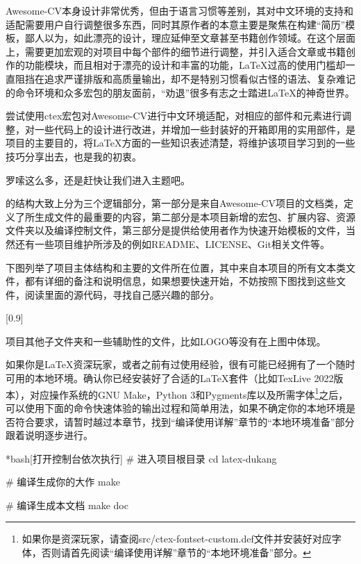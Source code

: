 Awesome-CV本身设计非常优秀，但由于语言习惯等差别，其对中文环境的支持和适配需要用户自行调整很多东西，同时其原作者的本意主要是聚焦在构建“简历”模板，鄙人以为，如此漂亮的设计，理应延伸至文章甚至书籍创作领域。在这个层面上，需要更加宏观的对项目中每个部件的细节进行调整，并引入适合文章或书籍创作的功能模块，而且相对于漂亮的设计和丰富的功能，{\LaTeX}过高的使用门槛却一直阻挡在追求严谨排版和高质量输出，却不是特别习惯看似古怪的语法、复杂难记的命令环境和众多宏包的朋友面前，“劝退”很多有志之士踏进{\LaTeX}的神奇世界。

尝试使用ctex宏包对Awesome-CV进行中文环境适配，对相应的部件和元素进行调整，对一些代码上的设计进行改进，并增加一些封装好的开箱即用的实用部件，是{\dk}项目的主要目的，将{\LaTeX}方面的一些知识表述清楚，将维护该项目学习到的一些技巧分享出去，也是我的初衷。

罗嗦这么多，还是赶快让我们进入主题吧。

{\dk}的结构大致上分为三个逻辑部分，第一部分是来自Awesome-CV项目的文档类，定义了所生成文件的最重要的内容，第二部分是本项目新增的宏包、扩展内容、资源文件夹以及编译控制文件，第三部分是提供给使用者作为快速开始模板的文件，当然还有一些项目维护所涉及的例如README、LICENSE、Git相关文件等。

下图列举了项目主体结构和主要的文件所在位置，其中来自本项目的所有文本类文件，都有详细的备注和说明信息，如果想要{\color{awesome}快速开始}，不妨按照下图找到这些文件，阅读里面的源代码，寻找自己感兴趣的部分。

[0.9]

\begin{dkcomment}
  项目其他子文件夹和一些辅助性的文件，比如LOGO等没有在上图中体现。
\end{dkcomment}


如果你是{\LaTeX}资深玩家，或者之前有过使用经验，很有可能已经拥有了一个随时可用的本地环境。确认你已经安装好了合适的{\LaTeX}套件（比如TexLive 2022版本），对应操作系统的GNU Make，Python 3和Pygments库以及所需字体\footnote{如果你是资深玩家，请查阅src/ctex-fontset-custom.def文件并安装好对应字体，否则请首先阅读“编译使用详解”章节的“本地环境准备”部分。}之后，可以使用下面的命令快速体验{\dk}的输出过程和简单用法，如果不确定你的本地环境是否符合要求，请暂时越过本章节，找到“编译使用详解”章节的“本地环境准备”部分跟着说明逐步进行。

\begin{dkcode}*{bash}[打开控制台依次执行]
# 进入项目根目录
cd latex-dukang

# 编译生成你的大作
make

# 编译生成本文档
make doc
\end{dkcode}


